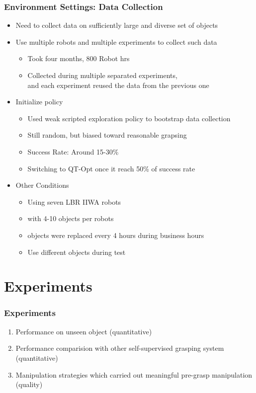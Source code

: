 \documentclass{beamer}
\newcommand{\fifthSec}{Environment Settings}
\newcommand{\sixthSec}{Experiments}
\begin{document}
    \begin{frame}
      \frametitle{\fifthSec : Data Collection}
      \begin{itemize}
        \item Need to collect data on sufficiently large and diverse set of objects
        \item Use multiple robots and multiple experiments to collect such data
        \begin{itemize}
          \item Took four months, 800 Robot hrs
          \item Collected during multiple separated experiments, \\
                and each experiment reused the data from the previous one
          \linebreak
        \end{itemize}
        \pause
        \item Initialize policy
        \begin{itemize}
          \item Used weak scripted exploration policy to bootstrap data collection
          \item Still random, but biased toward reasonable grapsing
          \item Success Rate: Around 15-30\%
          \item Switching to QT-Opt once it reach 50\% of success rate
          \linebreak
        \end{itemize}
        \pause
        \item Other Conditions
        \begin{itemize}
          \item Using seven LBR IIWA robots
          \item with 4-10 objects per robots
          \item objects were replaced every 4 hours during business hours
          \item Use different objects during test
        \end{itemize}
      \end{itemize}
    \end{frame}


  \section{\sixthSec}
    \begin{frame}
      \frametitle{\sixthSec}
      \begin{enumerate}
        \item Performance on unseen object (quantitative)
        \item Performance comparision with other self-supervised grasping system (quantitative)
        \item Manipulation strategies which carried out meaningful pre-grasp manipulation (quality)
      \end{enumerate}
    \end{frame}
\end{document}
